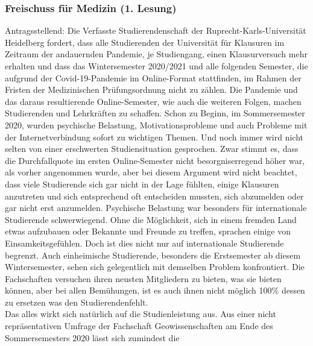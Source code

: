         \subsubsection{Freischuss für Medizin \label{corona:3.4} (1. Lesung)}
        Antragsstellend: 
            Die Verfasste Studierendenschaft der Ruprecht-Karls-Universität Heidelberg fordert,
            dass alle
            Studierenden der Universität für Klausuren im Zeitraum der andauernden Pandemie, je
            Studiengang, einen Klausurversuch mehr erhalten und dass das Wintersemester 2020/2021
            und alle
            folgenden Semester, die aufgrund der Covid-19-Pandemie im Online-Format stattfinden,
            im
            Rahmen der Fristen der Medizinischen Prüfungsordnung nicht zu zählen.
            Die Pandemie und das daraus resultierende Online-Semester, wie auch die weiteren Folgen, machen
            Studierenden und Lehrkräften zu schaffen. Schon zu Beginn, im Sommersemester 2020, wurden
            psychische Belastung, Motivationsprobleme und auch Probleme mit der Internetverbindung sofort
            zu wichtigen Themen. Und noch immer wird nicht selten von einer erschwerten Studiensituation
            gesprochen. Zwar stimmt es, dass die Durchfallquote im ersten Online-Semester nicht
            besorgniserregend höher war, als vorher angenommen wurde, aber bei diesem Argument wird nicht
            beachtet, dass viele Studierende sich gar nicht in der Lage fühlten, einige Klausuren anzutreten und
            sich entsprechend oft entscheiden mussten, sich abzumelden oder gar nicht erst anzumelden.
            Psychische Belastung war besonders für internationale Studierende schwerwiegend. Ohne die
            Möglichkeit, sich in einem fremden Land etwas aufzubauen oder Bekannte und Freunde zu treffen,
            sprachen einige von Einsamkeitsgefühlen. Doch ist dies nicht nur auf internationale Studierende
            begrenzt. Auch einheimische Studierende, besonders die Erstsemester ab diesem Wintersemester,
            sehen sich gelegentlich mit demselben Problem konfrontiert. Die Fachschaften versuchen ihren
            neusten Mitgliedern zu bieten, was sie bieten können, aber bei allen Bemühungen, ist es auch ihnen
            nicht möglich 100\% dessen zu ersetzen was den Studierendenfehlt.\\
            Das alles wirkt sich natürlich auf die Studienleistung aus. Aus einer nicht repräsentativen Umfrage
            der Fachschaft Geowissenschaften am Ende des Sommersemesters 2020 lässt sich zumindest die
